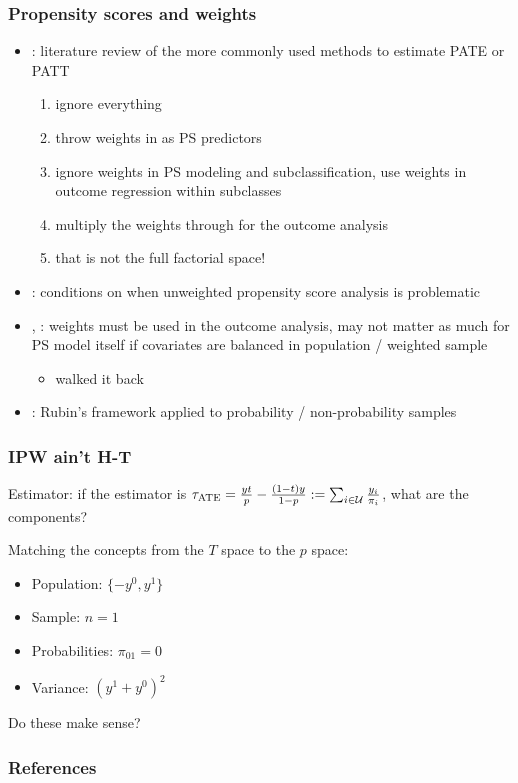 \documentclass[handout]{beamer}
\begin{document}
\begin{frame}\frametitle{Propensity scores and weights}

\begin{itemize}
	\item \citet{dong:stuart:lenis:nguyen:2020}: 
	      literature review of the more commonly used methods to estimate PATE or PATT
			\begin{enumerate}
				\item ignore everything
				\item throw weights in as PS predictors
			   \item ignore weights in PS modeling and subclassification, 
			          use weights in outcome regression within subclasses
			   \item multiply the weights through for the outcome analysis
			   \item that is not the full factorial space! 
			\end{enumerate}
	\item \citet{ridgeway:kovalchik:griffin:kabeto:2015}: 
	      conditions on when unweighted propensity score analysis is problematic
	\item \citet{lenis:nguyen:dong:stuart:2017},
			\citet{austin:jembere:chiu:2018}: weights must be used in the outcome analysis,
			may not matter as much for PS model itself if covariates are balanced in population
			/ weighted sample 
			\begin{itemize}
					\item \citet{dong:stuart:lenis:nguyen:2020} walked it back
			\end{itemize}
	\item \citet{mercer:kreuter:keeter:stuart:2017}: 
			Rubin's framework applied to probability / non-probability samples
\end{itemize}
\end{frame}

\begin{frame}\frametitle{IPW ain't H-T}

Estimator: if the estimator is $\tau_{\rm ATE}=\frac{yt}{p}-\frac{(1-t)y}{1-p} := \sum_{i \in \mathcal{U}} \frac{y_i}{\pi_i}$, 
what are the components?

Matching the concepts from the $T$ space to the $p$ space:

\begin{itemize}
    \item Population: $\{-y^0, y^1\}$
    \item Sample: $n=1$
    \item Probabilities: $\pi_{01}=0$
    \item Variance: $(y^1+y^0)^2$
\end{itemize}

Do these make sense? 

\end{frame}

\begin{frame}[allowframebreaks]\frametitle{References}




\end{frame}
\end{document}

